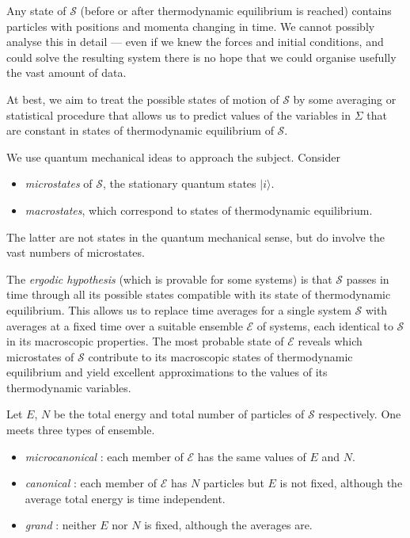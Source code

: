 \documentclass{notes}
\newcommand{\cS}{\mathcal{S}}
\newcommand{\cE}{\mathcal{E}}
\newcommand{\ket}[1]{|#1\rangle}
\begin{document}
Any state of $\cS$ (before or after thermodynamic equilibrium is reached)
contains particles with positions and momenta changing in time.  We cannot
possibly analyse this in detail --- even if we knew the forces and initial
conditions, and could solve the resulting system there is no hope that
we could organise usefully the vast amount of data.

At best, we aim to treat the possible states of motion of $\cS$ by some
averaging or statistical procedure that allows us to predict values of
the variables in $\Sigma$ that are constant in states of thermodynamic
equilibrium of $\cS$.

We use quantum mechanical ideas to approach the subject.  Consider

\begin{itemize}
\item \emph{microstates} of $\cS$, the stationary quantum states
$\ket{i}$.
\item \emph{macrostates}, which correspond to states of thermodynamic
equilibrium.
\end{itemize}

The latter are not states in the quantum mechanical sense, but do involve
the vast numbers of microstates.

The \emph{ergodic hypothesis} (which is provable for some systems) is that
$\cS$ passes in time through all its possible states compatible with
its state of thermodynamic equilibrium.  This allows us to replace
time averages for a single system $\cS$ with averages at a fixed time
over a suitable ensemble $\cE$ of systems, each identical to $\cS$ in
its macroscopic properties.  The most probable state of $\cE$ reveals
which microstates of $\cS$ contribute to its macroscopic states of
thermodynamic equilibrium and yield excellent approximations to the
values of its thermodynamic variables.

Let $E$, $N$ be the total energy and total number of particles of $\cS$
respectively.  One meets three types of ensemble.

\begin{itemize}
\item \emph{microcanonical} : each member of $\cE$ has the same values
of $E$ and $N$.
\item \emph{canonical} : each member of $\cE$ has $N$ particles but
$E$ is not fixed, although the average total energy is time independent.
\item \emph{grand} : neither $E$ nor $N$ is fixed, although the averages
are.
\end{itemize}
\end{document}
